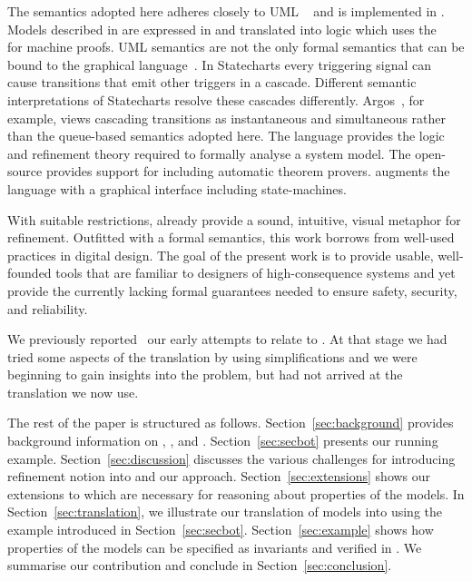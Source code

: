 The semantics adopted here adheres closely to UML \Statecharts~\cite{Alexandre} and is implemented in \iUMLB.
 Models described in \Statecharts are expressed in \SCXML and
 translated into \EventB logic which uses the \Rodin~\cite{abrial10:_rodin} for
 machine proofs.  UML \Statechart semantics are not the only formal
 semantics that can be bound to the \Statechart graphical
 language~\cite{Eshuis_2009}.  In Statecharts every triggering signal
 can cause transitions that emit other triggers in a cascade.
 Different semantic interpretations of Statecharts resolve these
 cascades differently.  Argos~\cite{Maraninchi91theargos}, for
 example, views cascading transitions as instantaneous and
 simultaneous rather than the queue-based semantics adopted here.
%
The \EventB language
\cite{abrial10:_model_event_b} provides the logic and refinement
theory required to formally analyse a system model.  The open-source
\Rodin provides support for \EventB
including automatic theorem provers.  \iUMLB
augments the \EventB language with a graphical interface including
state-machines.  

With suitable restrictions, \Statecharts already provide a sound,
intuitive, visual metaphor for refinement. Outfitted with a formal
semantics, this work borrows from well-used \Statechart practices in
digital design.  The goal of the present work is to provide usable,
well-founded tools that are familiar to designers of high-consequence
systems and yet provide the currently lacking formal guarantees needed
to ensure safety, security, and reliability.

We previously reported~\cite{Morris_2016} our early attempts to relate \Statecharts to \EventB. At that stage we had tried some aspects of the translation by using simplifications and we were beginning to gain insights into the problem, but had not arrived at the translation we now use.

The rest of the paper is structured as follows.  Section~\ref{sec:background} provides background information on \SCXML, \EventB, and \iUMLB.  Section~\ref{sec:secbot} presents our running example.  Section~\ref{sec:discussion} discusses the various challenges for introducing refinement notion into \SCXML and our approach.  Section~\ref{sec:extensions} shows our extensions to \SCXML which are necessary for reasoning about properties of the \SCXML models.  In Section~\ref{sec:translation}, we illustrate our translation of \SCXML models into \EventB using the example introduced in Section~\ref{sec:secbot}.  Section~\ref{sec:example} shows how properties of the \SCXML models can be specified as invariants and verified in \EventB.  We summarise our contribution and conclude in Section~\ref{sec:conclusion}.

